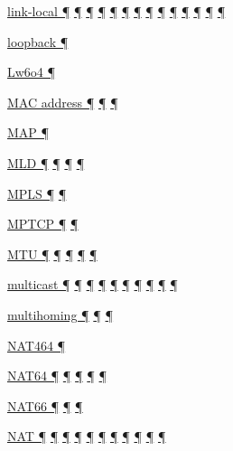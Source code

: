 \documentclass[
]{article}
\begin{document}
\hyperref[why-ipv6-is-so-complicated]{link-local ¶}
\hyperref[address-resolution]{¶} \hyperref[addresses]{¶}
\hyperref[auto-configuration]{¶} \hyperref[dns]{¶}
\hyperref[source-and-destination-address-selection]{¶}
\hyperref[filtering]{¶} \hyperref[network-design]{¶}
\hyperref[basic-windows-commands]{¶} \hyperref[energy-consumption]{¶}
\hyperref[multi-prefix-operation]{¶}
\hyperref[deployment-in-the-home]{¶} \hyperref[troubleshooting]{¶}
\hyperref[tools]{¶}

\hyperref[addresses]{loopback ¶}

\hyperref[translation-and-ipv4-as-a-service]{Lw6o4 ¶}

\hyperref[address-resolution]{MAC address ¶} \hyperref[addresses]{¶}
\hyperref[address-and-prefix-management]{¶}

\hyperref[translation-and-ipv4-as-a-service]{MAP ¶}

\hyperref[address-resolution]{MLD ¶}
\hyperref[layer-2-considerations]{¶} \hyperref[troubleshooting]{¶}
\hyperref[advanced-troubleshooting]{¶}

\hyperref[layer-2-functions]{MPLS ¶} \hyperref[tunnels]{¶}

\hyperref[transport-protocols]{MPTCP ¶} \hyperref[multihoming]{¶}

\hyperref[extension-headers-and-options]{MTU ¶}
\hyperref[layer-2-functions]{¶} \hyperref[packet-format]{¶}
\hyperref[packet-size-and-jumbo-frames]{¶}
\hyperref[advanced-troubleshooting]{¶}

\hyperref[address-resolution]{multicast ¶} \hyperref[addresses]{¶}
\hyperref[auto-configuration]{¶} \hyperref[layer-2-functions]{¶}
\hyperref[ipv6-primary-differences-from-ipv4]{¶} \hyperref[filtering]{¶}
\hyperref[layer-2-considerations]{¶} \hyperref[energy-consumption]{¶}
\hyperref[troubleshooting]{¶} \hyperref[advanced-troubleshooting]{¶}

\hyperref[multi-prefix-operation]{multihoming ¶}
\hyperref[multihoming]{¶} \hyperref[deployment-in-the-enterprise]{¶}

\hyperref[translation-and-ipv4-as-a-service]{NAT464 ¶}

\hyperref[dual-stack-scenarios]{NAT64 ¶}
\hyperref[obsolete-techniques]{¶}
\hyperref[translation-and-ipv4-as-a-service]{¶}
\hyperref[advanced-troubleshooting]{¶} \hyperref[tools]{¶}

\hyperref[ipv6-primary-differences-from-ipv4]{NAT66 ¶}
\hyperref[translation-and-ipv4-as-a-service]{¶} \hyperref[security]{¶}

\hyperref[why-ipv6-is-so-complicated]{NAT ¶}
\hyperref[transport-protocols]{¶} \hyperref[dual-stack-scenarios]{¶}
\hyperref[obsolete-techniques]{¶}
\hyperref[translation-and-ipv4-as-a-service]{¶} \hyperref[tunnels]{¶}
\hyperref[security]{¶} \hyperref[topology-obfuscation]{¶}
\hyperref[address-planning]{¶} \hyperref[multihoming]{¶}
\hyperref[deployment-in-the-enterprise]{¶}
\end{document}
